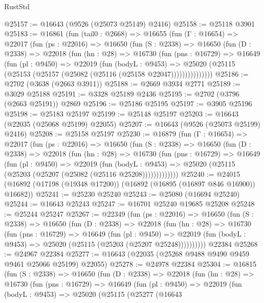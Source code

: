 \begin{lexlean}{RustStd}
\begin{coremodule}
@25157 := @16643 (@9526 (@25073 @25149) @2416)
@25158 := @25118 @3901
@25183 := @16861
    (fun (tail0 : @2668) =>
    @16655
      (fun (Γ : @16654) =>
      @22017
        (fun (ps : @22016) =>
        @16650
          (fun (S : @2338) =>
          @16650
            (fun (D : @2338) =>
            @22018
              (fun (hn : @28) =>
              @16730
                (fun (pns : @16729) =>
                @16649
                  (fun (pl : @9450) =>
                  @22019
                    (fun (bodyL : @9453) =>
                    @25020 (@25115 (@25153 (@25157 (@25082 (@25116 (@25158 @22047)))))))))))))))
@25186 := @2702 (@3638 (@2663 @3911))
@25188 := @2669 @3934 @2771
@25189 := @3029 @25188
@25191 := @3328 @25189 @2436
@25195 := @2702 (@3796 (@2663 @25191)) @2869
@25196 := @25186 @25195
@25197 := @3905 @25196
@25198 := @25183 @25197
@25199 := @25148 @25197
@25203 := @16643 (@22035 (@25068 @25199) @22055)
@25207 := @16643 (@9526 (@25073 @25199) @2416)
@25208 := @25158 @25197
@25230 := @16879
    (fun (Γ : @16654) =>
    @22017
      (fun (ps : @22016) =>
      @16650
        (fun (S : @2338) =>
        @16650
          (fun (D : @2338) =>
          @22018
            (fun (hn : @28) =>
            @16730
              (fun (pns : @16729) =>
              @16649
                (fun (pl : @9450) =>
                @22019
                  (fun (bodyL : @9453) =>
                  @25020 (@25115 (@25203 (@25207 (@25082 (@25116 @25208)))))))))))))
@25240 := @24015 (@16892 (@17198 (@19348 @17200)) (@16892 (@16895 (@16897 @846 @16900)) @16682))
@25241 := @25230 @25240
@25243 := @25080 (@16694 @25240)
@25244 := @16643 @25243
@25247 := @16701 @25240 @19685 @25208
@25248 := @25244 @25247
@25267 := @22349
    (fun (ps : @22016) =>
    @16650
      (fun (S : @2338) =>
      @16650
        (fun (D : @2338) =>
        @22018
          (fun (hn : @28) =>
          @16730
            (fun (pns : @16729) =>
            @16649
              (fun (pl : @9450) =>
              @22019 (fun (bodyL : @9453) => @25020 (@25115 (@25203 (@25207 @25248))))))))))
    @22384
@25268 := @24967 @22384
@25277 := @16643 (@22035 (@25268 @9488 @9490 @9459 @9461 @25066 @25199) @22055)
@25278 := @24978 @22384
@25304 := @16815
    (fun (S : @2338) =>
    @16650
      (fun (D : @2338) =>
      @22018
        (fun (hn : @28) =>
        @16730
          (fun (pns : @16729) =>
          @16649
            (fun (pl : @9450) =>
            @22019
              (fun (bodyL : @9453) =>
              @25020
                (@25115
                  (@25277
                    (@16643

\end{coremodule}
\end{lexlean}
